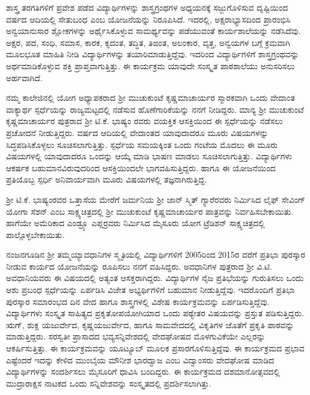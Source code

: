 {ಶಾಸ್ತ್ರ ತರಗತಿಗಳಿಗೆ ಪ್ರವೇಶ ಪಡೆದ ವಿದ್ಯಾರ್ಥಿಗಳನ್ನು ಶಾಸ್ತ್ರಗ್ರಂಥಗಳ ಅಧ್ಯಯನಕ್ಕೆ ಸಜ್ಜುಗೊಳಿಸುವ ದೃಷ್ಟಿಯಿಂದ ವರ್ಷದ ಆದಿಯಲ್ಲಿ ಸೇತುಬಂಧ ಎಂಬ ಯೋಜನೆಯನ್ನು ನಿರೂಪಿಸಿದೆ.  ಇದರಲ್ಲಿ, ಅಕ್ಷರಾಭ್ಯಾಸದಿಂದ ಪ್ರಾರಂಭಿಸಿ ಅನ್ವಯಾನುಸಾರ ಶ್ಲೋಕಗಳನ್ನು ಅರ್ಥೈಸಿಕೊಳ್ಳುವ ಸಾಮರ್ಥ್ಯವನ್ನು ಪಡೆಯುವಂತೆ ಕಾರ್ಯಶಾಲೆಯನ್ನು ನಡೆಸಿದೆವು.  ಅಕ್ಷರ, ಪದ, ಸಂಧಿ, ಸಮಾಸ, ಕಾರಕ, ಕೃದಂತ, ತದ್ಧಿತ, ತಿಙಂತ, ಅಲಂಕಾರ, ವೃತ್ತ, ಅನ್ವಯಗಳ ಬಗ್ಗೆ ಕ್ರಮವಾಗಿ ಮೂಲಭೂತ ಮಾಹಿತಿ ನೀಡಿ ವಿದ್ಯಾರ್ಥಿಗಳನ್ನು ತಯಾರಿಮಾಡುತ್ತಿದ್ದೆವು. ಇದರಿಂದ ವಿದ್ಯಾರ್ಥಿಗಳಿಗೆ ಶಾಸ್ತ್ರಗ್ರಂಥವನ್ನು ಅರ್ಥಮಾಡಿಕೊಳ್ಳುವ ಶಕ್ತಿ ಪ್ರಾಪ್ತವಾಗುತ್ತಿತ್ತು.  ಈ ಕಾರ್ಯಕ್ರಮ ಯಾವುದೇ ಸಂಸ್ಕೃತ ಪಾಠಶಾಲೆಯು ಅನುಸರಿಸಲು ಅರ್ಹವಾಗಿದೆ.  

ನಮ್ಮ ಕಾಲೇಜಿನಲ್ಲಿ ಯೋಗ ಅಧ್ಯಾಪಕರಾದ ಶ್ರೀ ಮುಚುಕುಂಟೆ ಕೃಷ್ಣಮಾಚಾರ್ಯರ ಸ್ಮಾರಕವಾಗಿ ಒಂದು ವೇದಾಂತ ವಾಕ್ಯಾರ್ಥ ಸ್ಪರ್ಧೆಯನ್ನು ರಾಜ್ಯಮಟ್ಟದಲ್ಲಿ ನಡೆಸುವ ಹೊಣೆಗಾರಿಕೆಯನ್ನು ನನಗೆ ನೀಡಿದ್ದರು.  ಮಾನ್ಯ ಶ್ರೀ ಮುಚುಕುಂಟೆ ಕೃಷ್ಣಮಾಚಾರ್ಯರ ಪುತ್ರರಾದ ಶ್ರೀ ಟಿ.ಕೆ. ಭಾಷ್ಯಂ ರವರು ವಯಕ್ತಿಕ ಆಸಕ್ತಿಯಿಂದ ಈ ಸ್ಪರ್ಧೆಯನ್ನು ನಡೆಸಲು ಪ್ರಚೋದನೆ ನೀಡುತ್ತಿದ್ದರು.  ವರ್ಷದ ಆದಿಯಲ್ಲಿ ವೇದಾಂತದ ಯಾವುದಾದರೂ ಮೂರು ವಿಷಯಗಳನ್ನು ಸಿದ್ಧಪಡಿಸಿಕೊಳ್ಳಲು ಸೂಚಿಸಲಾಗುತ್ತಿತ್ತು.   ಸ್ಪರ್ಧೆಯ ಸಮಯಕ್ಕಿಂತ ಒಂದು ಗಂಟೆಯ ಮೊದಲು ಈ ಮೂರು ವಿಷಯಗಳಲ್ಲಿ ಯಾವುದಾದರೂ ಒಂದನ್ನು ಆಯ್ಕೆ ಮಾಡಿ ಭಾಷಣ ಮಾಡಲು ಸೂಚಿಸಲಾಗುತ್ತಿತ್ತು.  ವಿದ್ಯಾರ್ಥಿಗಳು ಆಕರ್ಷಕ ಬಹುಮಾನವಿರುವುದರಿಂದ ಆಸಕ್ತಿಯಿಂದಲೇ ಭಾಗವಹಿಸುತ್ತಿದ್ದರು.  ಹಾಗೂ ಈ ಯೋಜನೆಯಿಂದ ಪ್ರತಿಯೊಬ್ಬ ಸ್ಪರ್ಧಿ ಅನಿವಾರ್ಯವಾಗಿ ಮೂರು ವಿಷಯಗಳಲ್ಲಿ ತಜ್ಞನಾಗಿರುತ್ತಿದ್ದ.  

ಶ್ರೀ ಟಿ.ಕೆ. ಭಾಷ್ಯಂರವರ ಒತ್ತಾಸೆಯ ಮೇರೆಗೆ ಜರ್ಮನಿಯ ಶ್ರೀ ಜಾನ್ ಸ್ಮಿತ್ ಗ್ಯಾರೆರವರು ನಿರ್ಮಿಸಿದ ಲೈಫ್ ಸೇವಿಂಗ್ ಯೋಗಾ ಸೆಶನ್ ಎಂಬ ಸಾಕ್ಷ್ಯಚಿತ್ರದಲ್ಲಿ ಶ್ರೀ ಮುಚುಕುಂಟೆ ಕೃಷ್ಣಮಾಚಾರ್ಯರ ಪಾತ್ರವನ್ನು ನಿರ್ವಹಿಸಬೇಕಾಯಿತು.  ಹಾಗೆಯೇ ಅಮೆರಿಕಾದ ಎಂಡ್ರ್ಯೂ ಎಪ್ಲರ್‍ರವರು ನಿರ್ಮಿಸಿದ ಮೈಸೂರು ಯೋಗ ಟ್ರೆಡಿಶನ್  ಸಾಕ್ಷ್ಯಚಿತ್ರದಲ್ಲಿ ಪಾಲ್ಗೊಳ್ಳಬೇಕಾಯಿತು. 

ನಂಜನಗೂಡಿನ ಶ್ರೀ ತಮ್ಮಯ್ಯಾವಧಾನಿಗಳ ಸ್ಮೃತಿಯಲ್ಲಿ ವಿದ್ಯಾರ್ಥಿಗಳಿಗೆ 2005ರಿಂದ 2015ರ ವರೆಗೆ ಪ್ರತಿಭಾ ಪುರಸ್ಕಾರ ನೀಡುವ ಕಾರ್ಯದ ಯೋಜನೆಯನ್ನು ರೂಪಿಸಲು ನನಗೆ ವಹಿಸಿದ್ದರು.  ಅವಧಾನಿಗಳ ಪುತ್ರರಾದ ಶ್ರೀ ವಿ.ಟಿ. ಅವಧಾನಿಯವರು ಈ ವಿಷಯದಲ್ಲಿ ಅತ್ಯಂತ ಆಸಕ್ತರಾಗಿದ್ದರು.  ವಿದ್ಯಾರ್ಥಿಗಳ ನೈಜ ಪ್ರತಿಭೆಯನ್ನು ಗುರುತಿಸಲು ಒಂದು ಆಶು ಪ್ರಬಂಧ ಸ್ಪರ್ಧೆಯನ್ನು ಏರ್ಪಡಿಸಿ ವಿಜೇತ ಅಭ್ಯರ್ಥಿಗಳಿಗೆ ಬಹುಮಾನ ನೀಡುತ್ತಿದ್ದೆವು.  ಇದರೊಂದಿಗೆ ಪ್ರತಿಭಾ ಪುರಸ್ಕಾರ ಸಮಾರಂಭದ ದಿನ ವೇದ ಹಾಗೂ ಶಾಸ್ತ್ರಗಳಲ್ಲಿ ವಿಶೇಷ ಕಾರ್ಯಕ್ರಮವನ್ನು ಏರ್ಪಡಿಸುತ್ತಿದ್ದೆವು.  ವಿದ್ಯಾರ್ಥಿಗಳು ಸಂಸ್ಕೃತ ಸಾಹಿತ್ಯದ ಪ್ರಕೃತೋಪಯೋಗಿಯಾದ ಒಂದು ಪಠ್ಯೇತರ ವಿಷಯವನ್ನು ಪ್ರಸ್ತುತ ಪಡಿಸುತ್ತಿದ್ದರು.  ಋಗ್, ಶುಕ್ಲ ಯಜುರ್ವೇದ, ಕೃಷ್ಣಯಜುರ್ವೇದ, ಹಾಗೂ ಸಾಮವೇದದಲ್ಲಿ ವಿಕೃತಿಗಳ ಜೊತೆಗೆ ಪ್ರಕೃತಿ ಪಾಠವನ್ನು ಮಾಡುತ್ತಿದ್ದರು.  ಸರಸ್ವತೀ ಪ್ರಾಸಾದದ ಭವ್ಯಸನ್ನಿವೇಶದಲ್ಲಿ ವೇದಘೋಷದ ಮೊಳಗುವಿಕೆಯೇ ಎಲ್ಲರನ್ನು ಆಕರ್ಷಿಸುತ್ತಿತ್ತು.  ಈ ಕಾರ್ಯಕ್ರಮವನ್ನು ಯೂಟ್ಯೂಬ್ ಮೂಲಕ ಪ್ರಸಾರಗೊಳಿಸುತ್ತಿದ್ದೆವು.  ಈ ಕಾರ್ಯಕ್ರಮದ ಪ್ರಭಾವ ಎಷ್ಟೆಂದರೆ ಇದನ್ನು ಕೇಳಿದ ಮುಂಬೈಯ ಮೌನೀಶ ಭಾರದ್ವಾಜ ಎಂಬ ವಿದ್ವಾಂಸರು ವೇದಘೋಷ ಮಾಡಿದ ವಿದ್ಯಾರ್ಥಿಗಳನ್ನು ಸಂದರ್ಶಿಸಲು ಮೈಸೂರಿಗೆ ಧಾವಿಸಿ ಬಂದಿದ್ದರು.  ಈ ಕಾರ್ಯಕ್ರಮದ ದಶಮಾನೋತ್ಸವದಲ್ಲಿ  ಮುದ್ರಾರಾಕ್ಷಸ ನಾಟಕದ ಒಂದು ಸನ್ನಿವೇಶವನ್ನು ಸಂಸ್ಕೃತದಲ್ಲಿ ಪ್ರದರ್ಶಿಸಲಾಗಿತ್ತು. 

}
